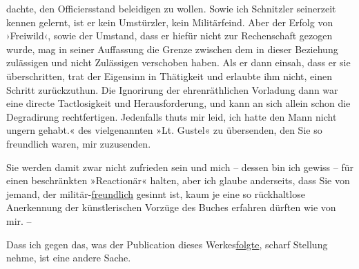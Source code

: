 {{{                     dachte, den Officiersstand beleidigen zu wollen. Sowie ich Schnitzler
                     seinerzeit kennen gelernt, ist er kein Umstürzler, kein Militärfeind. Aber der
                     Erfolg von ›Freiwild‹, sowie der Umstand, dass er hiefür nicht zur Rechenschaft
                     gezogen wurde, mag  in seiner Auffassung die
                     Grenze zwischen dem in dieser Beziehung zulässigen und nicht Zulässigen
                     verschoben haben. Als er dann einsah, dass er sie überschritten, trat der
                     Eigensinn in Thätigkeit und erlaubte ihm nicht, einen Schritt zurückzuthun. Die
                     Ignorirung der ehrenräthlichen Vorladung dann war eine directe Tactlosigkeit
                     und Herausforderung, und kann an sich allein schon die Degradirung
                     rechtfertigen. Jedenfalls thuts mir leid, ich hatte den Mann nicht ungern
                     gehabt.« }}}\label{K_L04233-1} des vielgenannten »Lt.
                  Gustel« zu übersenden, den Sie so freundlich waren, mir zuzusenden.\pend
           
\pstart
           Sie werden damit zwar nicht zufrieden sein und mich – dessen bin ich gewiss – für
               einen beschränkten »Reactionär« halten, aber ich glaube anderseits, dass Sie von
               jemand, der militär-\uline{freundlich} gesinnt ist, kaum {\pb}je eine so rückhaltlose Anerkennung der künstlerischen Vorzüge des
                  Buches erfahren dürften wie
               von mir. –\pend
           
\pstart
           Dass ich gegen das, was der Publication dieses Werkes\uline{folgte}, scharf Stellung nehme, ist eine andere
               Sache.\pend
           
